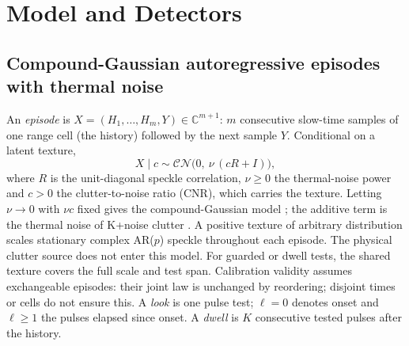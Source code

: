 \documentclass[journal]{IEEEtran}
\begin{document}
\section{Model and Detectors}\label{sec:model}
\subsection{Compound-Gaussian autoregressive episodes with thermal noise}
An \emph{episode} is $X=(H_1,\dots,H_m,Y)\in\mathbb{C}^{m+1}$: $m$ consecutive slow-time samples of one range cell (the history) followed by the next sample $Y$. Conditional on a latent texture,
\begin{equation}
X\mid c\sim\mathcal{CN}\big(0,\ \nu\,(cR+I)\big),
\label{eq:r7model}
\end{equation}
where $R$ is the unit-diagonal speckle correlation, $\nu\ge0$ the thermal-noise power and $c>0$ the clutter-to-noise ratio (CNR), which carries the texture. Letting $\nu\to0$ with $\nu c$ fixed gives the compound-Gaussian model \cite{conte1995,ollila2012}; the additive term is the thermal noise of K+noise clutter \cite{watts1987,ward2013}. A positive texture of arbitrary distribution scales stationary complex AR($p$) speckle throughout each episode. The physical clutter source does not enter this model. For guarded or dwell tests, the shared texture covers the full scale and test span. Calibration validity assumes exchangeable episodes: their joint law is unchanged by reordering; disjoint times or cells do not ensure this. A \emph{look} is one pulse test; $\ell=0$ denotes onset and $\ell\ge1$ the pulses elapsed since onset. A \emph{dwell} is $K$ consecutive tested pulses after the history.
\end{document}
